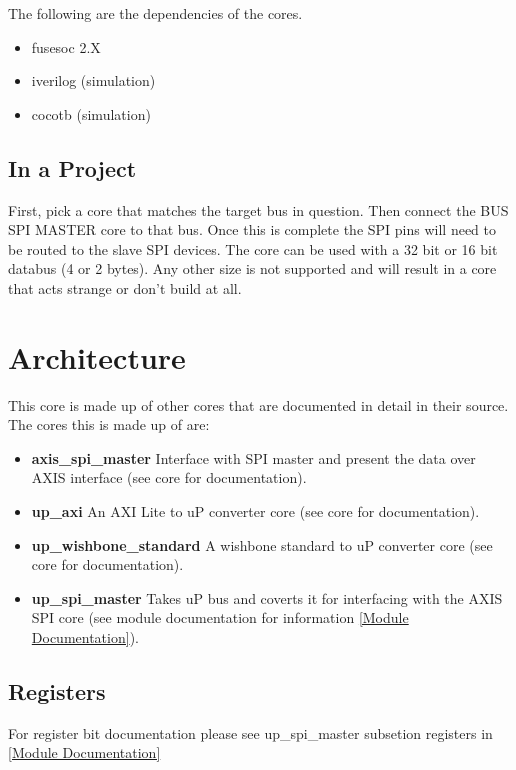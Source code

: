 \par
The following are the dependencies of the cores.

\begin{itemize}
  \item fusesoc 2.X
  \item iverilog (simulation)
  \item cocotb (simulation)
\end{itemize}







\subsection{In a Project}
\par
First, pick a core that matches the target bus in question. Then connect the BUS SPI MASTER core to that bus. Once this is complete the SPI pins will need to be routed to the slave SPI devices. The core can be used with a 32 bit or 16 bit databus (4 or 2 bytes). Any other size is not supported and will result in a core that acts strange or don't build at all.

\section{Architecture}
\par
This core is made up of other cores that are documented in detail in their source. The cores this is made up of are:
\begin{itemize}
  \item \textbf{axis\_spi\_master} Interface with SPI master and present the data over AXIS interface (see core for documentation).
  \item \textbf{up\_axi} An AXI Lite to uP converter core (see core for documentation).
  \item \textbf{up\_wishbone\_standard} A wishbone standard to uP converter core (see core for documentation).
  \item \textbf{up\_spi\_master} Takes uP bus and coverts it for interfacing with the AXIS SPI core (see module documentation for information \ref{Module Documentation}).
\end{itemize}

\subsection{Registers}
For register bit documentation please see up\_spi\_master subsetion registers in \ref{Module Documentation}

